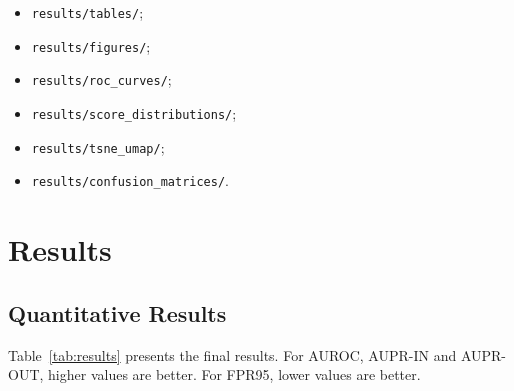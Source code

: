 \documentclass[11pt,a4paper]{article}
\begin{document}
\begin{itemize}
    \item \texttt{results/tables/};
    \item \texttt{results/figures/};
    \item \texttt{results/roc\_curves/};
    \item \texttt{results/score\_distributions/};
    \item \texttt{results/tsne\_umap/};
    \item \texttt{results/confusion\_matrices/}.
\end{itemize}

\section{Results}

\subsection{Quantitative Results}

Table~\ref{tab:results} presents the final results.
For AUROC, AUPR-IN and AUPR-OUT, higher values are better.
For FPR95, lower values are better.
\end{document}
